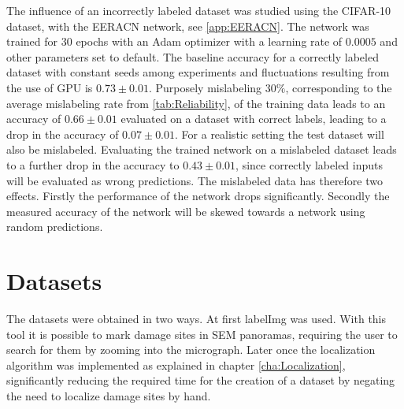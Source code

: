 The influence of an incorrectly labeled dataset was studied using the CIFAR-10 dataset, with the EERACN network, see \ref{app:EERACN}. The network was trained for $30$ epochs with an Adam optimizer \cite{Sharma2017} with a learning rate of $0.0005$ and other parameters set to default. The baseline accuracy for a correctly labeled dataset with constant seeds among experiments and fluctuations resulting from the use of GPU is $0.73\pm 0.01$. Purposely mislabeling $30 \%$, corresponding to the average mislabeling rate from \ref{tab:Reliability}, of the training data leads to an accuracy of $0.66\pm 0.01$ evaluated on a dataset with correct labels, leading to a drop in the accuracy of $0.07 \pm 0.01$. For a realistic setting the test dataset will also be mislabeled. Evaluating the trained network on a mislabeled dataset leads to a further drop in the accuracy to $0.43\pm 0.01$, since correctly labeled inputs will be evaluated as wrong predictions. The mislabeled data has therefore two effects. Firstly the performance of the network drops significantly. Secondly the measured accuracy of the network will be skewed towards a network using random predictions. 




\section{Datasets}
The datasets were obtained in two ways. At first labelImg \cite{labelImg} was used. With this tool it is possible to mark damage sites in SEM panoramas, requiring the user to search for them by zooming into the micrograph. Later once the localization algorithm was implemented as explained in chapter \ref{cha:Localization}, significantly reducing the required time for the creation of a dataset by negating the need to localize damage sites by hand. \\


